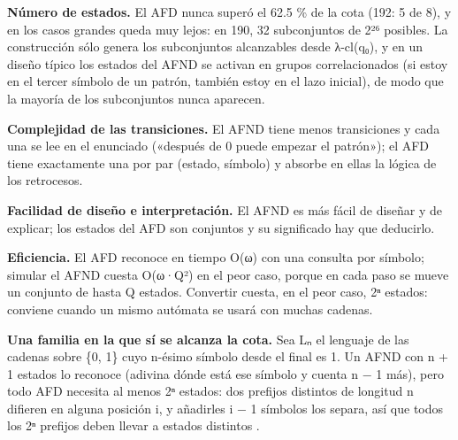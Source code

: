 \textbf{Número de estados.} El AFD nunca superó el 62.5 \% de la cota (192: 5 de 8), y en los casos grandes queda muy lejos: en 190, 32 subconjuntos de 2²⁶ posibles. La construcción sólo genera los subconjuntos alcanzables desde λ-cl(q₀), y en un diseño típico los estados del AFND se activan en grupos correlacionados (si estoy en el tercer símbolo de un patrón, también estoy en el lazo inicial), de modo que la mayoría de los subconjuntos nunca aparecen.

\textbf{Complejidad de las transiciones.} El AFND tiene menos transiciones y cada una se lee en el enunciado («después de 0 puede empezar el patrón»); el AFD tiene exactamente una por par (estado, símbolo) y absorbe en ellas la lógica de los retrocesos.

\textbf{Facilidad de diseño e interpretación.} El AFND es más fácil de diseñar y de explicar; los estados del AFD son conjuntos y su significado hay que deducirlo.

\textbf{Eficiencia.} El AFD reconoce en tiempo O(\textbar ω\textbar) con una consulta por símbolo; simular el AFND cuesta O(\textbar ω\textbar·\textbar Q\textbar²) en el peor caso, porque en cada paso se mueve un conjunto de hasta \textbar Q\textbar{} estados. Convertir cuesta, en el peor caso, 2ⁿ estados: conviene cuando un mismo autómata se usará con muchas cadenas.

\textbf{Una familia en la que sí se alcanza la cota.} Sea Lₙ el lenguaje de las cadenas sobre \{0, 1\} cuyo n-ésimo símbolo desde el final es 1. Un AFND con n + 1 estados lo reconoce (adivina dónde está ese símbolo y cuenta n − 1 más), pero todo AFD necesita al menos 2ⁿ estados: dos prefijos distintos de longitud n difieren en alguna posición i, y añadirles i − 1 símbolos los separa, así que todos los 2ⁿ prefijos deben llevar a estados distintos \autocite[sec.~2.3.6]{hopcroft2007}.

